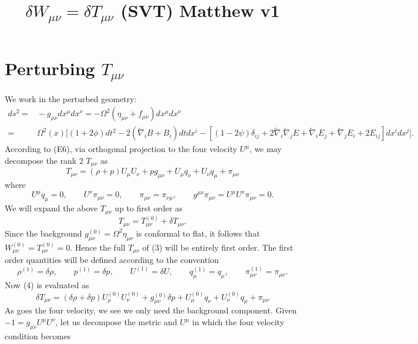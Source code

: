 \documentclass[10pt,letterpaper]{article}
\title{$\delta W_{\mu\nu} = \delta T_{\mu\nu}$ (SVT) Matthew v1}
\date{}
\begin{document}
\maketitle
\noindent 
\section*{Perturbing $T_{\mu\nu}$}
We work in the perturbed geometry:
\begin{align}
ds^2 =&{} - g_{\mu\nu}dx^\mu dx^\nu= -\Omega^2(\eta_{\mu\nu}+f_{\mu\nu})dx^\mu dx^\nu \nonumber\\
=\ &{} \Omega^2(x)\bigg[ (1+2\phi)dt^2 - 2(\tilde\nabla_i B+ B_i)dtdx^i - [(1-2\psi)\delta_{ij} + 2\tilde\nabla_i\tilde\nabla_j E + \tilde\nabla_i E_j + \tilde\nabla_j E_i 
+ 2 E_{ij}]dx^idx^j\bigg].
\end{align}
According to (E6), via orthogonal projection to the four velocity $U^\mu$, we may decompose the rank 2 $T_{\mu\nu}$ as
\begin{equation}
T_{\mu\nu} = (\rho+p)U_\mu U_\nu + p g_{\mu\nu} + U_\mu q_\nu + U_\nu q_\mu + \pi_{\mu\nu}
\end{equation}
where
\begin{equation}
	U^\mu q_{\mu} = 0,\qquad U^\nu \pi_{\mu\nu} = 0,\qquad \pi_{\mu\nu} = \pi_{\nu\mu},\qquad g^{\mu\nu}\pi_{\mu\nu} =U^\mu U^\nu \pi_{\mu\nu} = 0.
\end{equation}
We will expand the above $T_{\mu\nu}$ up to first order as
\begin{equation}
	T_{\mu\nu} = T_{\mu\nu}^{(0)} + \delta T_{\mu\nu}.
\end{equation}
Since the background $g_{\mu\nu}^{(0)} = \Omega^2 \eta_{\mu\nu}$ is conformal to flat, it follows that $W_{\mu\nu}^{(0)} = T_{\mu\nu}^{(0)} = 0$. Hence the full $T_{\mu\nu}$ of (3) will be entirely first order. The first order quantities will be defined according to the convention
\begin{equation}
\rho^{(1)} = \delta \rho,\qquad p^{(1)} = \delta p,\qquad U^{(1)} = \delta U,\qquad q_\mu^{(1)} = q_\mu,\qquad \pi_{\mu\nu}^{(1)} = \pi_{\mu\nu}.
\end{equation}
Now (4) is evaluated as
\begin{equation}
	\delta T_{\mu\nu} = (\delta \rho + \delta p)U^{(0)}_{\mu}U^{(0)}_{\nu} + g_{\mu\nu}^{(0)}\delta p  + U_\mu^{(0)}q_\nu + U_\nu^{(0)}q_\mu + \pi_{\mu\nu}
\end{equation}
As goes the four velocity, we see we only need the background component. Given $-1 =  g_{\mu\nu}U^\mu U^\nu$, let us decompose the metric and $U^\mu$ in which the four velocity condition becomes
\end{document}
